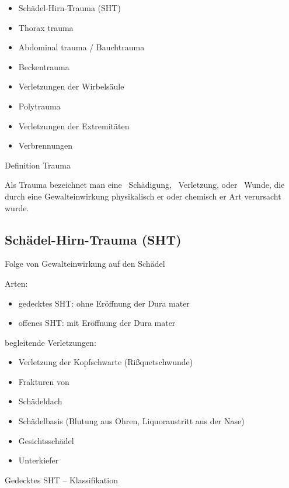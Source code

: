 \documentclass{article}
\begin{document}
\begin{itemize}
\item Sch\"adel-Hirn-Trauma (SHT)

\item Thorax trauma

\item Abdominal trauma / Bauchtrauma

\item Beckentrauma

\item Verletzungen der Wirbels\"aule

\item Polytrauma

\item Verletzungen der Extremit\"aten

\item Verbrennungen

\end{itemize}
Definition Trauma

Als Trauma  bezeichnet man eine {\textperiodcentered}~Sch\"adigung,
{\textperiodcentered}~Verletzung, oder {\textperiodcentered}~Wunde, die
durch eine Gewalteinwirkung physikalisch er oder chemisch er Art
verursacht wurde.

\subsection{Sch\"adel-Hirn-Trauma (SHT)}
Folge von Gewalteinwirkung auf den  Sch\"adel

Arten:

\begin{itemize}
\item gedecktes SHT: ohne  Er\"offnung der Dura  mater

\item offenes SHT: mit  Er\"offnung der Dura mater

\end{itemize}
begleitende Verletzungen:

\begin{itemize}
\item Verletzung der Kopfschwarte  (Ri{\ss}quetschwunde)

\item Frakturen von

\end{itemize}
\begin{itemize}
\item Sch\"adeldach

\item Sch\"adelbasis (Blutung aus Ohren, Liquoraustritt  aus der Nase)

\item Gesichtssch\"adel

\item Unterkiefer

\end{itemize}
Gedecktes SHT -- Klassifikation
\end{document}

